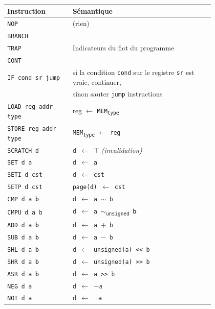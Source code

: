 \documentclass[french]{article}
\begin{document}
  \begin{figure}
    \begin{tabular}{|l|l|} \hline
      \textbf{Instruction} & \textbf{Sémantique}\\ \hline \hline
      \texttt{NOP} & (rien)\\ \hline
      \texttt{BRANCH} & \\
      \texttt{TRAP} & Indicateurs du flot du programme\\
      \texttt{CONT} & \\ \hline
      \texttt{IF cond sr jump} & si la condition \texttt{cond} sur le registre \texttt{sr} est vraie, continuer,\\
      & sinon sauter \texttt{jump} instructions\\ \hline
      \texttt{LOAD reg addr type} & reg $\leftarrow$ \texttt{MEM\textsubscript{type}} \\ \hline
      \texttt{STORE reg addr type} & \texttt{MEM\textsubscript{type}} $\leftarrow$ \texttt{reg}\\ \hline
      \texttt{SCRATCH d} & \texttt{d $\leftarrow$ $\top$} \textit{(invalidation)}\\ \hline
      \texttt{SET d a} & \texttt{d $\leftarrow$ a}\\ \hline
      \texttt{SETI d cst} & \texttt{d $\leftarrow$ cst}\\ \hline
      \rowcolor{Gray} \texttt{SETP d cst} & \texttt{page(d) $\leftarrow$ cst}\\ \hline
      \texttt{CMP d a b} & \texttt{d $\leftarrow$ a $\sim$ b}\\ \hline
      \rowcolor{Gray} \texttt{CMPU d a b} & \texttt{d $\leftarrow$ a $\sim$\textsubscript{unsigned} b}\\ \hline
      \texttt{ADD d a b} & \texttt{d $\leftarrow$ a $+$ b}\\ \hline
      \texttt{SUB d a b} & \texttt{d $\leftarrow$ a $-$ b}\\ \hline
      \rowcolor{Gray} \texttt{SHL d a b} & \texttt{d $\leftarrow$ unsigned(a) <{<} b}\\ \hline
      \rowcolor{Gray} \texttt{SHR d a b} & \texttt{d $\leftarrow$ unsigned(a) >{>} b}\\ \hline
      \texttt{ASR d a b} & \texttt{d $\leftarrow$ a >{>} b}\\ \hline
      \texttt{NEG d a} & \texttt{d $\leftarrow$ $-$a}\\ \hline
      \rowcolor{Gray} \texttt{NOT d a} & \texttt{d $\leftarrow$ $\neg$a}\\ \hline

\end{tabular}
\end{figure}
\end{document}

